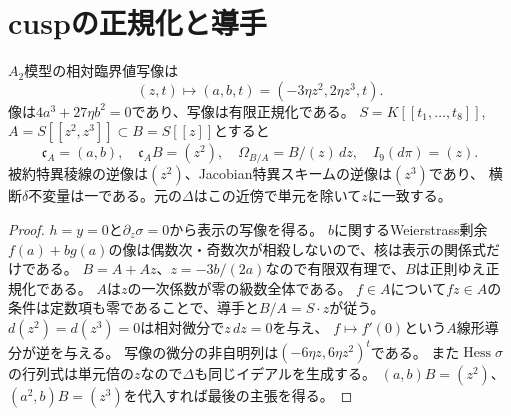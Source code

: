 \section{cuspの正規化と導手}
\begin{proposition}\label{mh:cusp}
$A_2$模型の相対臨界値写像は
\[
 (z,t)\longmapsto(a,b,t)=(-3\eta z^2,2\eta z^3,t).
\]
像は$4a^3+27\eta b^2=0$であり、写像は有限正規化である。
$S=K[[t_1,\ldots,t_8]]$, $A=S[[z^2,z^3]]\subset B=S[[z]]$とすると
\[
 \mathfrak c_A=(a,b),\quad \mathfrak c_AB=(z^2),\quad
 \Omega_{B/A}=B/(z)\,dz,\quad I_9(d\pi)=(z).
\]
被約特異稜線の逆像は$(z^2)$、Jacobian特異スキームの逆像は$(z^3)$であり、
横断$\delta$不変量は一である。元の$\Delta$はこの近傍で単元を除いて$z$に一致する。
\end{proposition}
\begin{proof}
$h=y=0$と$\partial_z\sigma=0$から表示の写像を得る。
$b$に関するWeierstrass剰余$f(a)+bg(a)$の像は偶数次・奇数次が相殺しないので、核は表示の関係式だけである。
$B=A+Az$、$z=-3b/(2a)$なので有限双有理で、$B$は正則ゆえ正規化である。
$A$は$z$の一次係数が零の級数全体である。
$f\in A$について$fz\in A$の条件は定数項も零であることで、導手と$B/A=S\cdot z$が従う。
$d(z^2)=d(z^3)=0$は相対微分で$z\,dz=0$を与え、
$f\mapsto f'(0)$という$A$線形導分が逆を与える。
写像の微分の非自明列は$(-6\eta z,6\eta z^2)^t$である。
また$\operatorname{Hess}\sigma$の行列式は単元倍の$z$なので$\Delta$も同じイデアルを生成する。
$(a,b)B=(z^2)$、$(a^2,b)B=(z^3)$を代入すれば最後の主張を得る。
\end{proof}


